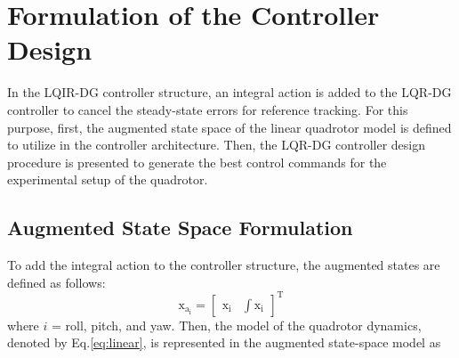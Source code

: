 \documentclass[conference]{IEEEtran}
\begin{document}










\section{Formulation of the Controller Design}\label{sec: diff game}

\noindent In the LQIR-DG controller structure, an integral action is added to the LQR-DG controller to cancel the steady-state errors for reference tracking. For this purpose, first, the augmented state space of the linear quadrotor model is defined to utilize in the controller architecture. Then, the LQR-DG controller design procedure is presented to generate the best control commands for the experimental setup of the quadrotor.

\subsection{Augmented State Space Formulation}
\noindent To add the integral action to the controller structure, the augmented states are defined as follows:
\begin{equation}\label{lqidg_x}
    \boldsymbol{\mathrm{x_{a_i}}} = \begin{bmatrix}
        \boldsymbol{\mathrm{x_i}} &
        \displaystyle \int \boldsymbol{\mathrm{x_i}}
    \end{bmatrix}^\mathrm{T}
\end{equation}
where $i$ = roll, pitch, and yaw.
Then, the model of the quadrotor dynamics, denoted by Eq.\eqref{eq:linear}, is represented in the augmented state-space model as
\end{document}
